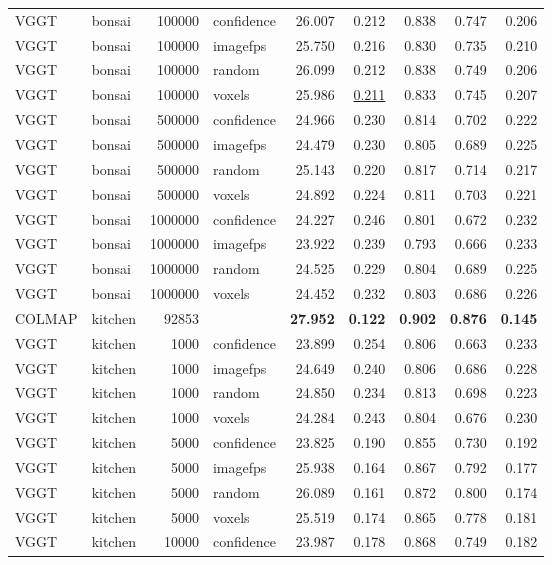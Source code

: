 \begin{table}[H]
\begin{tabular}{llrlrrrrr}
VGGT & bonsai & 100000 & confidence & 26.007 & 0.212 & 0.838 & 0.747 & 0.206 \\
VGGT & bonsai & 100000 & imagefps & 25.750 & 0.216 & 0.830 & 0.735 & 0.210 \\
VGGT & bonsai & 100000 & random & 26.099 & 0.212 & 0.838 & 0.749 & 0.206 \\
VGGT & bonsai & 100000 & voxels & 25.986 & \underline{0.211} & 0.833 & 0.745 & 0.207 \\
VGGT & bonsai & 500000 & confidence & 24.966 & 0.230 & 0.814 & 0.702 & 0.222 \\
VGGT & bonsai & 500000 & imagefps & 24.479 & 0.230 & 0.805 & 0.689 & 0.225 \\
VGGT & bonsai & 500000 & random & 25.143 & 0.220 & 0.817 & 0.714 & 0.217 \\
VGGT & bonsai & 500000 & voxels & 24.892 & 0.224 & 0.811 & 0.703 & 0.221 \\
VGGT & bonsai & 1000000 & confidence & 24.227 & 0.246 & 0.801 & 0.672 & 0.232 \\
VGGT & bonsai & 1000000 & imagefps & 23.922 & 0.239 & 0.793 & 0.666 & 0.233 \\
VGGT & bonsai & 1000000 & random & 24.525 & 0.229 & 0.804 & 0.689 & 0.225 \\
VGGT & bonsai & 1000000 & voxels & 24.452 & 0.232 & 0.803 & 0.686 & 0.226 \\
\midrule
COLMAP & kitchen & 92853 &  & \textbf{27.952} & \textbf{0.122} & \textbf{0.902} & \textbf{0.876} & \textbf{0.145} \\
VGGT & kitchen & 1000 & confidence & 23.899 & 0.254 & 0.806 & 0.663 & 0.233 \\
VGGT & kitchen & 1000 & imagefps & 24.649 & 0.240 & 0.806 & 0.686 & 0.228 \\
VGGT & kitchen & 1000 & random & 24.850 & 0.234 & 0.813 & 0.698 & 0.223 \\
VGGT & kitchen & 1000 & voxels & 24.284 & 0.243 & 0.804 & 0.676 & 0.230 \\
VGGT & kitchen & 5000 & confidence & 23.825 & 0.190 & 0.855 & 0.730 & 0.192 \\
VGGT & kitchen & 5000 & imagefps & 25.938 & 0.164 & 0.867 & 0.792 & 0.177 \\
VGGT & kitchen & 5000 & random & 26.089 & 0.161 & 0.872 & 0.800 & 0.174 \\
VGGT & kitchen & 5000 & voxels & 25.519 & 0.174 & 0.865 & 0.778 & 0.181 \\
VGGT & kitchen & 10000 & confidence & 23.987 & 0.178 & 0.868 & 0.749 & 0.182 \\

\end{tabular}
\end{table}
